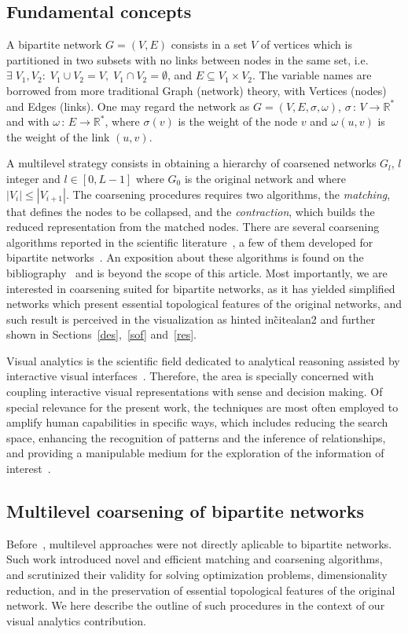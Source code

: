 \documentclass[runningheads]{llncs}
\begin{document}
\subsection{Fundamental concepts}\label{bac}
A bipartite network $G=(V,E)$ consists in a set $V$ of vertices which is partitioned in two subsets
with no links between nodes in the same set, i.e. $\exists\; V_1, V_2:\; V_1\cup V_2 = V,\;V_1\cap V_2 = \emptyset$, and $E\subseteq V_1 \times V_2$.
The variable names are borrowed from more traditional
Graph (network) theory, with Vertices (nodes) and Edges (links).
One may regard the network as $G=(V,E,\sigma,\omega)$,
$\sigma\,:\,V\rightarrow \mathbb{R}^*$ and with $\omega\,:\,E \rightarrow \mathbb{R}^*$,
where $\sigma(v)$ is the weight of the node $v$ and
$\omega(u,v)$ is the weight of the link $(u,v)$.

A multilevel strategy consists in obtaining a hierarchy of coarsened networks $G_l$, $l$ integer and $l \in [0,L-1]$ where $G_0$ is the original network
and where $|V_i| \leq |V_{i+1}|$.
The coarsening procedures requires two algorithms, the \emph{matching}, that defines the nodes to be collapsed, and the \emph{contraction}, which builds the reduced representation
from the matched nodes.
There are several coarsening algorithms reported in the scientific literature~\cite{}, a few of them
developed for bipartite networks~\cite{}.
An exposition about these algorithms is found on the bibliography~\cite{} and is beyond the scope of this article.
Most importantly, we are interested in coarsening suited for bipartite networks,
as it has yielded simplified networks which present essential topological features
of the original networks,
and such result is perceived in the visualization as hinted in\~cite{alan2} and further shown in
Sections~\ref{des},~\ref{sof} and~\ref{res}.

Visual analytics is the scientific field dedicated to analytical reasoning assisted by interactive visual interfaces~\cite{}.
Therefore, the area is specially concerned with coupling interactive visual representations with sense and decision making.
Of special relevance for the present work, the techniques are most often employed to amplify human capabilities in specific ways,
which includes reducing the search space, enhancing the recognition of patterns and the inference of relationships,
and providing a manipulable medium for the exploration of the information of interest~\cite{}.

\subsection{Multilevel coarsening of bipartite networks}\label{bac}
Before~\cite{alan2}, multilevel approaches were not directly aplicable to bipartite networks.
Such work introduced novel and efficient matching and coarsening algorithms,
and scrutinized their validity for solving optimization problems, dimensionality reduction,
and in the preservation of essential topological features of the original network.
We here describe the outline of such procedures in the context of our visual analytics contribution.
\end{document}
